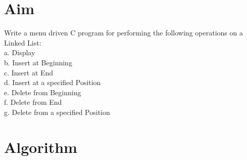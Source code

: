 
\section{Aim}
Write a menu driven C program for performing the following operations on a Linked List:
\\a. Display
\\b. Insert at Beginning
\\c. Insert at End
\\d. Insert at a specified Position
\\e. Delete from Beginning
\\f. Delete from End
\\g. Delete from a specified Position

\section{Algorithm}

